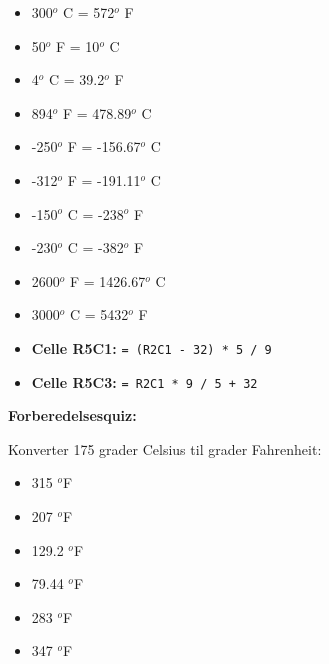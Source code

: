 





\begin{itemize}
\item{} 300$^{o}$ C = 572$^{o}$ F 
\vskip 5pt
\item{} 50$^{o}$ F = 10$^{o}$ C 
\vskip 5pt
\item{} 4$^{o}$ C = 39.2$^{o}$ F 
\vskip 5pt
\item{} 894$^{o}$ F = 478.89$^{o}$ C 
\vskip 5pt
\item{} -250$^{o}$ F = -156.67$^{o}$ C 
\vskip 5pt
\item{} -312$^{o}$ F = -191.11$^{o}$ C 
\vskip 5pt
\item{} -150$^{o}$ C = -238$^{o}$ F 
\vskip 5pt
\item{} -230$^{o}$ C = -382$^{o}$ F 
\vskip 5pt
\item{} 2600$^{o}$ F = 1426.67$^{o}$ C 
\vskip 5pt
\item{} 3000$^{o}$ C = 5432$^{o}$ F 
\end{itemize}








\begin{itemize}
\item{} {\bf Celle R5C1:} {\tt = (R2C1 - 32) * 5 / 9}
\item{} {\bf Celle R5C3:} {\tt = R2C1 * 9 / 5 + 32}
\end{itemize}


\vfil \eject

\noindent
{\bf Forberedelsesquiz:}

Konverter 175 grader Celsius til grader Fahrenheit:

\begin{itemize}
\item{} 315 $^{o}$F 
\vskip 5pt 
\item{} 207 $^{o}$F 
\vskip 5pt 
\item{} 129.2 $^{o}$F 
\vskip 5pt 
\item{} 79.44 $^{o}$F 
\vskip 5pt 
\item{} 283 $^{o}$F
\vskip 5pt 
\item{} 347 $^{o}$F
\end{itemize}



